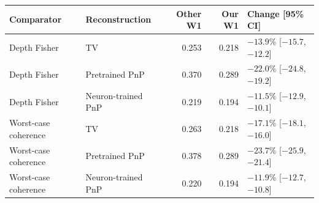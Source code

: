 \begin{tabular}{llrrl}
\toprule
Comparator & Reconstruction & Other W1 & Our W1 & Change [95\% CI] \\
\midrule
Depth Fisher & TV & 0.253 & 0.218 & $-13.9\%$ [$-15.7$, $-12.2$] \\
Depth Fisher & Pretrained PnP & 0.370 & 0.289 & $-22.0\%$ [$-24.8$, $-19.2$] \\
Depth Fisher & Neuron-trained PnP & 0.219 & 0.194 & $-11.5\%$ [$-12.9$, $-10.1$] \\
Worst-case coherence & TV & 0.263 & 0.218 & $-17.1\%$ [$-18.1$, $-16.0$] \\
Worst-case coherence & Pretrained PnP & 0.378 & 0.289 & $-23.7\%$ [$-25.9$, $-21.4$] \\
Worst-case coherence & Neuron-trained PnP & 0.220 & 0.194 & $-11.9\%$ [$-12.7$, $-10.8$] \\
\bottomrule
\end{tabular}
